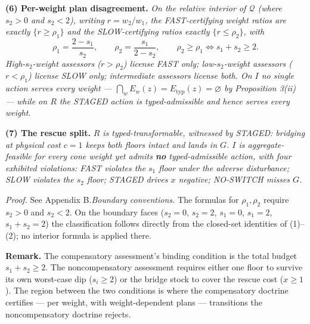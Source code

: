 \documentclass[review,11pt]{elsarticle}
\begin{document}
\textbf{(6) Per-weight plan disagreement.} \emph{On the relative
interior of \(\mathcal{Q}\) (where \(s_2 > 0\) and \(s_2 < 2\)), writing
\(r = w_2 / w_1\), the FAST-certifying weight ratios are exactly
\(\{ r \ge \rho_1 \}\) and the SLOW-certifying ratios exactly
\(\{ r \le \rho_2 \}\), with}
\[\rho_1 = \frac{2 - s_1}{s_2}, \qquad \rho_2 = \frac{s_1}{2 - s_2}, \qquad \rho_2 \ge \rho_1 \iff s_1 + s_2 \ge 2.\]
\emph{High-\(s_2\)-weight assessors (\(r > \rho_2\)) license FAST only;
low-\(s_2\)-weight assessors (\(r < \rho_1\)) license SLOW only;
intermediate assessors license both. On \(I\) no single action serves
every weight ---
\(\bigcap_w E_w(z) = E_{\mathrm{typ}}(z) = \varnothing\) by Proposition
3(ii) --- while on \(R\) the STAGED action is typed-admissible and hence
serves every weight.}

\textbf{(7) The rescue split.} \emph{\(R\) is typed-transformable,
witnessed by STAGED: bridging at physical cost \(c = 1\) keeps both
floors intact and lands in \(G\). \(I\) is aggregate-feasible for every
cone weight yet admits \textbf{no} typed-admissible action, with four
exhibited violations: FAST violates the \(s_1\) floor under the adverse
disturbance; SLOW violates the \(s_2\) floor; STAGED drives \(x\)
negative; NO-SWITCH misses \(G\).}

\emph{Proof.} See Appendix B.\emph{Boundary conventions.} The formulas for \(\rho_1, \rho_2\) require
\(s_2 > 0\) and \(s_2 < 2\). On the boundary faces (\(s_2 = 0\),
\(s_2 = 2\), \(s_1 = 0\), \(s_1 = 2\), \(s_1 + s_2 = 2\)) the
classification follows directly from the closed-set identities of
(1)--(2); no interior formula is applied there.

\textbf{Remark.} The compensatory assessment's binding condition is the
total budget \(s_1 + s_2 \ge 2\). The noncompensatory assessment requires either one floor to survive its own worst-case dip (\(s_i \ge 2\)) or the bridge stock to cover the rescue cost (\(x \ge 1\)). The region between the two conditions is
where the compensatory doctrine certifies --- per weight, with
weight-dependent plans --- transitions the noncompensatory doctrine
rejects.
\end{document}
